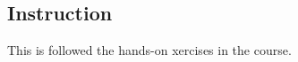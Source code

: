 \documentclass{article}
\begin{document}
\subsection{Instruction} This is followed the hands-on xercises in the course.
\end{document}
